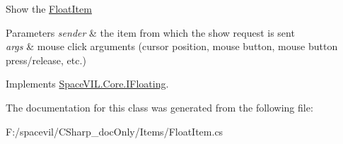 Show the \mbox{\hyperlink{class_space_v_i_l_1_1_float_item}{Float\+Item}} 


\begin{DoxyParams}{Parameters}
{\em sender} & the item from which the show request is sent \\
\hline
{\em args} & mouse click arguments (cursor position, mouse button, mouse button press/release, etc.) \\
\hline
\end{DoxyParams}


Implements \mbox{\hyperlink{interface_space_v_i_l_1_1_core_1_1_i_floating}{Space\+V\+I\+L.\+Core.\+I\+Floating}}.



The documentation for this class was generated from the following file\+:\begin{DoxyCompactItemize}
\item 
F\+:/spacevil/\+C\+Sharp\+\_\+doc\+Only/\+Items/Float\+Item.\+cs\end{DoxyCompactItemize}
